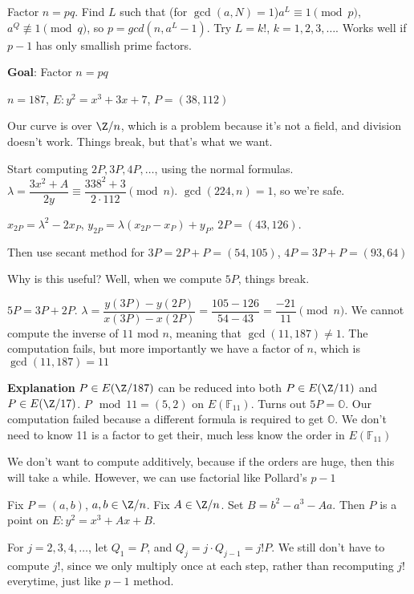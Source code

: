 \documentclass[twoside, 10pt]{article}
\newcommand{\F}{\mathbb{F}}
\renewcommand{\O}{\mathbb{O}}
\begin{document}
Factor $n = pq$. Find $L$ such that (for $\gcd(a, N) = 1$)$a^L \equiv 1 \pmod{p}$, $a^Q \not\equiv 1\pmod{q}$, so $p = gcd(n, a^L - 1)$.
Try $L = k!$, $k = 1, 2, 3, \ldots$. Works well if $p-1$ has only smallish prime factors.

\textbf{Goal}: Factor $n = pq$

\begin{exm*}
    $n = 187$, $E: y^2 = x^3 + 3x + 7$, $P = (38, 112)$
\end{exm*}
Our curve is over $\Z/n$, which is a problem because it's not a field, and division doesn't work. Things break, but that's what we want.

Start computing $2P, 3P, 4P, \ldots$, using the normal formulas. $\lambda = \dfrac{3x^2 + A}{2y} \equiv \dfrac{338^2 + 3}{2\cdot 112} \pmod{n}$. $\gcd(224, n) = 1$, so we're safe.

$x_{2P} = \lambda^2 - 2x_P$, $y_{2P} = \lambda(x_{2P}-x_P) + y_P$, $2P = (43, 126)$.

Then use secant method for $3P = 2P + P = (54, 105)$, $4P = 3P + P = (93, 64)$

Why is this useful? Well, when we compute $5P$, things break.

$5P = 3P + 2P$. $\lambda = \dfrac{y(3P) - y(2P)}{x(3P) - x(2P)} = \dfrac{105-126}{54-43} = \dfrac{-21}{11} \pmod{n}$. We cannot compute the inverse of $11$ mod $n$, meaning that $\gcd(11, 187) \neq 1$. The computation fails, but more importantly we have a factor of $n$, which is $\gcd(11, 187) = 11$

\textbf{Explanation} $P \in E(\Z/187)$ can be reduced into both $P \in E(\Z/11)$ and $P \in E(\Z/17)$. $P \mod{11} = (5, 2)$ on $E(\F_{11})$. Turns out $5P = \O$. Our computation failed because a different formula is required to get $\O$. We don't need to know 11 is a factor to get their, much less know the order in $E(\F_11)$

\begin{rmk}
    We don't want to compute additively, because if the orders are huge, then this will take a while. However, we can use factorial like Pollard's $p-1$
\end{rmk}

Fix $P = (a, b)$, $a, b \in \Z/n$. Fix $A \in \Z/n$. Set $B = b^2 - a^3 -Aa$. Then $P$ is a point on $E: y^2 = x^3 + Ax + B$.

For $j = 2, 3, 4, \ldots$, let $Q_1 = P$, and $Q_j = j\cdot Q_{j-1} = j!P$. We still don't have to compute $j!$, since we only multiply once at each step, rather than recomputing $j!$ everytime, just like $p-1$ method.
\end{document}
